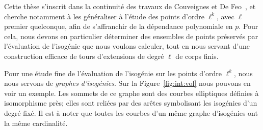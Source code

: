 \documentclass[10pt,a4paper]{book}
\theoremstyle{plain}
\theoremstyle{definition}
\theoremstyle{definition}
\theoremstyle{definition}
\theoremstyle{definition}
\theoremstyle{definition}
\theoremstyle{remark}
\theoremstyle{remark}
\theoremstyle{definition}
\begin{document}
Cette thèse s'inscrit dans la continuité des travaux de Couveignes 
\cite{Couveignes96} et De Feo~\cite{DeFeo11}, et cherche notamment à les 
généraliser à l'étude des points d'ordre $\ell^k$, avec $\ell$ premier 
quelconque, afin de s'affranchir de la dépendance polynomiale en $p$. Pour 
cela, nous devons en particulier déterminer des ensembles de points préservés 
par l'évaluation de l'isogénie que nous voulons calculer, tout en nous servant 
d'une construction efficace de tours d'extensions de degré $\ell$ de corps 
finis. 

Pour une étude fine de l'évaluation de l'isogénie sur les points d'ordre $\ell^k$, 
nous nous servons de \emph{graphes d'isogénies}.
Sur la Figure~\ref{fig:int:vol} nous pouvons en voir un exemple. Les sommets de
ce graphe sont des courbes elliptiques définies à isomorphisme près; elles sont
reliées par des arêtes symbolisant les isogénies d'un degré fixé. Il est à noter que
toutes les courbes d'un même graphe d'isogénies ont la même 
cardinalité.
\end{document}
